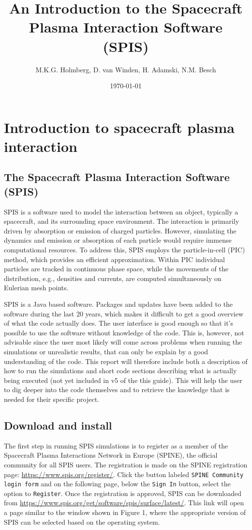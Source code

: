 \documentclass[a4paper, 11pt]{article}
\title{An Introduction to the Spacecraft Plasma Interaction Software (SPIS)}
\date{\today}
\author{M.K.G. Holmberg, D. van Winden, H. Adamski, N.M. Besch}
\begin{document}
\maketitle

\newpage
\tableofcontents
\newpage

\section{Introduction to spacecraft plasma interaction}

\subsection{The Spacecraft Plasma Interaction Software (SPIS)}

SPIS is a software used to model the interaction between an object, typically a spacecraft, and its surrounding space environment. The interaction is primarily driven by absorption or emission of charged particles. However, simulating the dynamics and emission or absorption of each particle would require immense computational resources. To address this, SPIS employs the particle-in-cell (PIC) method, which provides an efficient approximation. Within PIC individual particles are tracked in continuous phase space, while the movements of the distribution, e.g., densities and currents, are computed simultaneously on Eulerian mesh points.\par
SPIS is a Java based software. Packages and updates have been added to the software during the last 20 years, which makes it difficult to get a good overview of what the code actually does. The user interface is good enough so that it's possible to use the software without knowledge of the code. This is, however, not advisable since the user most likely will come across problems when running the simulations or unrealistic results, that can only be explain by a good understanding of the code. This report will therefore include both a description of how to run the simulations and short code sections describing what is actually being executed (not yet included in v5 of the this guide). This will help the user to dig deeper into the code themselves and to retrieve the knowledge that is needed for their specific project.

\subsection{Download and install}

The first step in running SPIS simulations is to register as a member of the  Spacecraft Plasma Interactions Network in Europe (SPINE), the official community for all SPIS users. The registration is made on the SPINE registration page: \url{https://www.spis.org/register/}. Click the button labeled \verb|SPINE Community login form| and on the following page, below the \verb|Sign In| button, select the option to \verb|Register|.  Once the registration is approved, SPIS can be downloaded from \url{https://www.spis.org/get/software/spis/surface/latest/}. This link will open a page similar to the window shown in Figure 1, where the appropriate version of SPIS can be selected based on the operating system.
\end{document}
